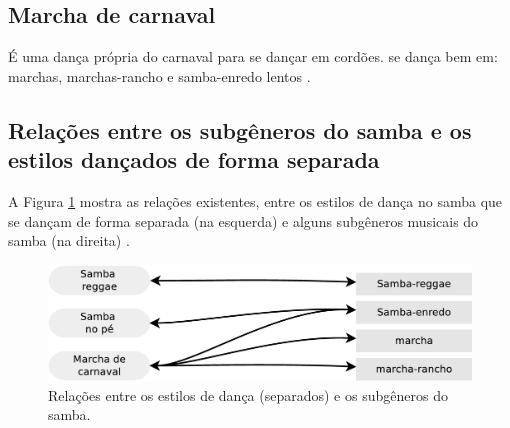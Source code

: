 \subsection{Marcha de carnaval}
 É uma dança própria do carnaval para se dançar em cordões.
se dança bem em: marchas, marchas-rancho e samba-enredo lentos  \cite[pp. 135]{perna2002samba}.


\subsection{Relações entre os subgêneros do samba e os estilos dançados de forma separada}

A Figura \ref{fig:sambadavavsmusicaseparado} mostra as relações existentes, 
entre os estilos de dança no samba que se dançam de forma separada (na esquerda) 
e alguns subgêneros musicais do samba (na direita)  \cite[pp. 134-138]{perna2002samba}.

\begin{figure}[h]
  \centering
    \includegraphics[width=1.0\textwidth]{chapters/cap-historia-dancasamba/dancavcmusicaseparado.eps}
  \caption{Relações entre os estilos de dança (separados) e os subgêneros do samba.}
\label{fig:sambadavavsmusicaseparado}
\end{figure}
